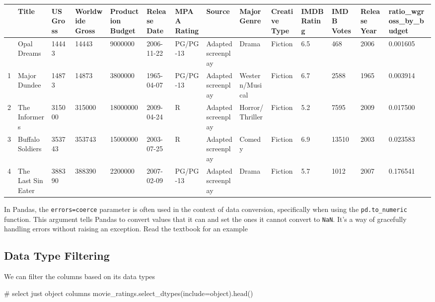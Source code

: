 \documentclass[
  letterpaper,
  DIV=11,
  numbers=noendperiod]{scrreprt}
\newenvironment{Shaded}{\begin{snugshade}}{\end{snugshade}}
\newcommand{\CommentTok}[1]{\textcolor[rgb]{0.37,0.37,0.37}{#1}}
\newcommand{\NormalTok}[1]{\textcolor[rgb]{0.00,0.23,0.31}{#1}}
\newcommand{\OperatorTok}[1]{\textcolor[rgb]{0.37,0.37,0.37}{#1}}
\newcommand{\StringTok}[1]{\textcolor[rgb]{0.13,0.47,0.30}{#1}}
\begin{document}
\begin{longtable}[]{@{}llllllllllllll@{}}
\toprule\noalign{}
& Title & US Gross & Worldwide Gross & Production Budget & Release Date
& MPAA Rating & Source & Major Genre & Creative Type & IMDB Rating &
IMDB Votes & Release Year & ratio\_wgross\_by\_budget \\
\midrule\noalign{}
\endhead
\bottomrule\noalign{}
\endlastfoot
0 & Opal Dreams & 14443 & 14443 & 9000000 & 2006-11-22 & PG/PG-13 &
Adapted screenplay & Drama & Fiction & 6.5 & 468 & 2006 & 0.001605 \\
1 & Major Dundee & 14873 & 14873 & 3800000 & 1965-04-07 & PG/PG-13 &
Adapted screenplay & Western/Musical & Fiction & 6.7 & 2588 & 1965 &
0.003914 \\
2 & The Informers & 315000 & 315000 & 18000000 & 2009-04-24 & R &
Adapted screenplay & Horror/Thriller & Fiction & 5.2 & 7595 & 2009 &
0.017500 \\
3 & Buffalo Soldiers & 353743 & 353743 & 15000000 & 2003-07-25 & R &
Adapted screenplay & Comedy & Fiction & 6.9 & 13510 & 2003 & 0.023583 \\
4 & The Last Sin Eater & 388390 & 388390 & 2200000 & 2007-02-09 &
PG/PG-13 & Adapted screenplay & Drama & Fiction & 5.7 & 1012 & 2007 &
0.176541 \\
\end{longtable}

In Pandas, the
\texttt{errors=\textquotesingle{}coerce\textquotesingle{}} parameter is
often used in the context of data conversion, specifically when using
the \texttt{pd.to\_numeric} function. This argument tells Pandas to
convert values that it can and set the ones it cannot convert to
\texttt{NaN}. It's a way of gracefully handling errors without raising
an exception. Read the textbook for an example

\hypertarget{data-type-filtering}{%
\subsection{Data Type Filtering}\label{data-type-filtering}}

We can filter the columns based on its data types

\begin{Shaded}
\begin{Highlighting}[]

\CommentTok{\# select just object columns}
\NormalTok{movie\_ratings.select\_dtypes(include}\OperatorTok{=}\StringTok{\textquotesingle{}object\textquotesingle{}}\NormalTok{).head()}
\end{Highlighting}
\end{Shaded}
\end{document}
